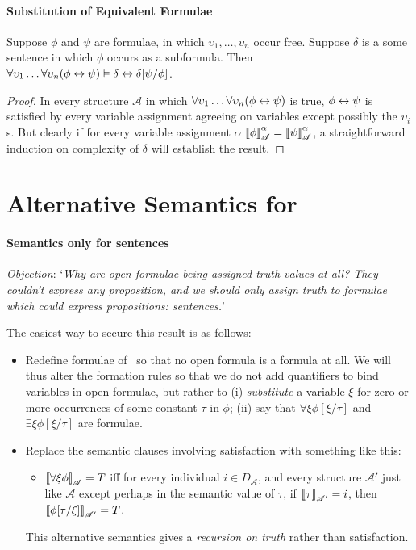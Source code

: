 \paragraph{Substitution of Equivalent Formulae}

\begin{theorem}
	Suppose $\phi$ and $\psi$ are formulae, in which $\upsilon_{1},\ldots,\upsilon_{n}$ occur free. Suppose $\delta$ is a some sentence in which $\phi$ occurs as a subformula. Then $\forall\upsilon_{1}\ldots\forall\upsilon_{n}(\phi\leftrightarrow\psi)\vDash \delta \leftrightarrow \delta[\psi/\phi]$. \begin{proof}
In every structure $\mathscr{A}$ in which $\forall\upsilon_{1}\ldots\forall\upsilon_{n}(\phi\leftrightarrow\psi)$ is true, $\phi\leftrightarrow\psi$ is satisfied by every variable assignment agreeing on variables except possibly the $\upsilon_{i}$s.  But clearly if for every variable assignment $\alpha$ $\left\llbracket\phi\right\rrbracket^{\alpha}_{\mathscr{A}}=\left\llbracket\psi\right\rrbracket^{\alpha}_{\mathscr{A}}$, a straightforward induction on complexity of $\delta$ will establish the result.
	\end{proof}
\end{theorem}




\section{Alternative Semantics for \texorpdfstring{\ltwo}{L2}}
\paragraph{Semantics only for sentences}

\emph{Objection}: `\emph{Why are open formulae being assigned truth values at all? They couldn't express any proposition, and we should only assign truth to formulae which could express propositions: sentences.}'

The easiest way to secure this result is as follows: \begin{itemize}
	\item  Redefine formulae of \ltwo\ so that no open formula is a formula at all. We will thus alter the formation rules so that we do not add quantifiers to bind variables in open formulae, but rather to (i) \emph{substitute} a variable $\xi$ for zero
or more occurrences of some constant $\tau$ in $\phi$; (ii) say that $\forall\xi\phi[\xi/\tau]$ and $\exists\xi\phi[\xi/\tau]$ are formulae.
\item Replace the semantic clauses involving satisfaction with something like this:
\begin{itemize}\item $\left\llbracket \forall\xi \phi\right\rrbracket_{\mathscr{A}} = T$  iff  for every
	individual $i \in D_{\mathscr{A}}$, and every structure $\mathscr{A}'$ just like $\mathscr{A}$ except perhaps in the semantic value of $\tau$,
	if $\left\llbracket \tau\right\rrbracket_{\mathscr{A'}}=i$, then $\left\llbracket \phi[\tau/\xi]\right\rrbracket_{\mathscr{A'}}=T$.
\end{itemize}
This alternative semantics gives a \emph{recursion on truth} \label{fiverectr} rather than satisfaction.
\end{itemize}

